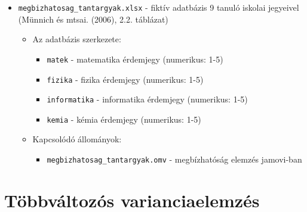 \documentclass[
  letterpaper,
]{krantz}
\providecommand{\tightlist}{%
  \setlength{\itemsep}{0pt}\setlength{\parskip}{0pt}}\usepackage{longtable,booktabs,array}
\begin{document}
\begin{itemize}
\item
  \texttt{megbizhatosag\_tantargyak.xlsx} - fiktív adatbázis 9 tanuló
  iskolai jegyeivel (Münnich és mtsai. (2006), 2.2. táblázat)

  \begin{itemize}
  \item
    Az adatbázis szerkezete:

    \begin{itemize}
    \tightlist
    \item
      \texttt{matek} - matematika érdemjegy (numerikus: 1-5)
    \item
      \texttt{fizika} - fizika érdemjegy (numerikus: 1-5)
    \item
      \texttt{informatika} - informatika érdemjegy (numerikus: 1-5)
    \item
      \texttt{kemia} - kémia érdemjegy (numerikus: 1-5)
    \end{itemize}
  \item
    Kapcsolódó állományok:

    \begin{itemize}
    \tightlist
    \item
      \texttt{megbizhatosag\_tantargyak.omv} - megbízhatóság elemzés
      jamovi-ban
    \end{itemize}
  \end{itemize}
\end{itemize}

\hypertarget{tuxf6bbvuxe1ltozuxf3s-varianciaelemzuxe9s}{%
\section{Többváltozós
varianciaelemzés}\label{tuxf6bbvuxe1ltozuxf3s-varianciaelemzuxe9s}}
\end{document}
